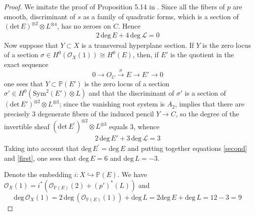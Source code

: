 \documentclass[a4paper]{amsart}
\theoremstyle{plain}
\theoremstyle{definition}
\begin{document}
\begin{proof}
    We imitate the proof of Proposition 5.14 in \cite{Lvovski}.
    Since all the fibers of $p$ are smooth, discriminant of $s$ as a family of quadratic forms, which is a section of $(\mathrm{det}\, E)^{\otimes 2}\otimes L^{\otimes 4}$, has no zeroes on $C$. Hence
    \begin{gather}
        \label{first}
        2 \,\mathrm{deg}\, E + 4\,\mathrm{deg}\, \mathcal L = 0
    \end{gather}
    Now suppose that $Y \subset X$ is a transversal hyperplane section. If $Y$ is the
    zero locus of a section $\sigma \in H^{0}(\mathcal {O}_X(1)) \cong H^0(E)$, then, if $E'$ is the quotient
    in the exact sequence
    \[
    0 \to O_C \stackrel{\sigma}{\to}E \to E' \to 0
    \]
    one sees that $Y \subset \mathbb P(E')$ is the zero locus of a section $\sigma' \in H^0(\mathrm{Sym}^2(E')\otimes L)$
    and that the discriminant of $\sigma'$ is a section of $(\mathrm{det}\, E')^{\otimes 2} \otimes L^{\otimes 3}$;
    since the
    vanishing root system is $A_2$, \cite[Proposition 5.13]{Lvovski} implies that there are precisely
    $3$ degenerate fibers of the induced pencil $Y \to C$, so the degree of the
    invertible sheaf $(\mathrm{det}\,E^{'})^{\otimes 2} \otimes L^{\otimes 3}$ equals 3, whence
    \begin{gather}
        \label{second}
        2\,\mathrm{deg}\, E' +3\,\mathrm{deg}\, \mathcal L = 3
    \end{gather}
    Taking into account that $\mathrm{deg}\, E^{'} = \mathrm{deg}\, E$ and putting together equations \ref{second} and \ref{first},
    one sees that $\mathrm{deg}\, E = 6$ and $\mathrm{deg}\,L = -3$.

    Denote the embedding $i \colon X \hookrightarrow \mathbb P(E)$.
    We have $\mathcal O_{X}(1) = i^*(\mathcal O_{\mathbb P(E)}(2)+(p')^*(L))$ and
    \[
    \mathrm{deg}\, \mathcal O_{X}(1) = 2\,\mathrm{deg}\, (\mathcal O_{\mathbb P(E)}(1)) + \mathrm{deg}\,L = 2\mathrm{deg}\, E + \mathrm{deg}\, L = 12-3=9
    \]
    

\end{proof}
\end{document}
